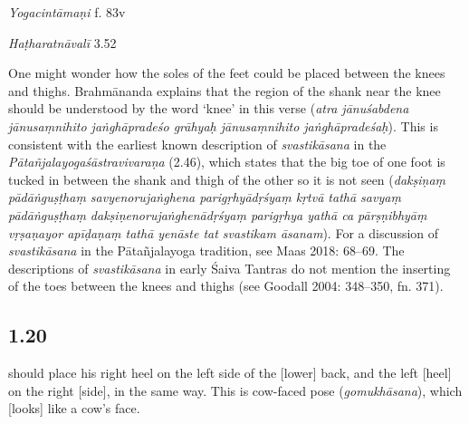 \begin{ekdosis}
\begin{sources}[hp01_019]
\end{sources}

\begin{testimonia}[hp01_019]
\emph{Yogacintāmaṇi} f. 83v

\begin{versinnote}
\end{versinnote}

\emph{Haṭharatnāvalī} 3.52

\begin{versinnote}
\end{versinnote}

\end{testimonia}

\begin{philcomm}[hp01_019]        
One might wonder how the soles of the feet could be placed between the knees and thighs. Brahmānanda explains that the region of the shank near the knee should be understood by the word ‘knee’ in this verse (\emph{atra jānuśabdena jānusaṃnihito jaṅghāpradeśo grāhyaḥ jānusaṃnihito jaṅghāpradeśaḥ}). This is consistent with the earliest known description of \emph{svastikāsana} in the \emph{Pātañjalayogaśāstravivaraṇa} (2.46), which states that the big toe of one foot is tucked in between the shank and thigh of the other so it is not seen (\emph{dakṣiṇaṃ pādāṅguṣṭhaṃ savyenorujaṅghena parigṛhyādṛśyaṃ kṛtvā tathā savyaṃ pādāṅguṣṭhaṃ dakṣiṇenorujaṅghenādṛśyaṃ parigṛhya yathā ca pārṣṇibhyāṃ vṛṣaṇayor apīḍaṇaṃ tathā yenāste tat svastikam āsanam}). For a discussion of \emph{svastikāsana} in the Pātañjalayoga tradition, see Maas 2018: 68–69. The descriptions of \emph{svastikāsana} in early Śaiva Tantras do not mention the inserting of the toes between the knees and thighs (see Goodall 2004: 348–350, fn. 371).
\end{philcomm}

\subsection*{1.20}
\begin{translation} should place his right heel on the left side of the [lower] back, and the left [heel] on the right [side], in the same way. This is cow-faced pose (\emph{gomukhāsana}), which [looks] like a cow's face.
\end{translation}


\end{ekdosis}
